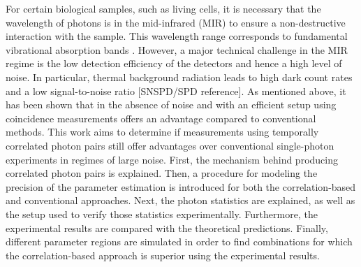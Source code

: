 For certain biological samples, such as living cells, it is necessary that the wavelength of photons is in the mid-infrared (MIR) to ensure a non-destructive interaction with the sample. This wavelength range corresponds to fundamental vibrational absorption bands \cite{katoLabelfreeVisualizationPhotosynthetic2023,ishiganeLabelfreeMidinfraredPhotothermal2023}. However, a major technical challenge in the MIR regime is the low detection efficiency of the detectors and hence a high level of noise. In particular, thermal background radiation leads to high dark count rates and a low signal-to-noise ratio [SNSPD/SPD reference]. \newline
As mentioned above, it has been shown that in the absence of noise and with an efficient setup using coincidence measurements offers an advantage compared to conventional methods. This work aims to determine if measurements using temporally correlated photon pairs still offer advantages over conventional single-photon experiments in regimes of large noise. \newline
First, the mechanism behind producing correlated photon pairs is explained. Then, a procedure for modeling the precision of the parameter estimation is introduced for both the correlation-based and conventional approaches. Next, the photon statistics are explained, as well as the setup used to verify those statistics experimentally. Furthermore, the experimental results are compared with the theoretical predictions. Finally, different parameter regions are simulated in order to find combinations for which the correlation-based approach is superior using the experimental results.







